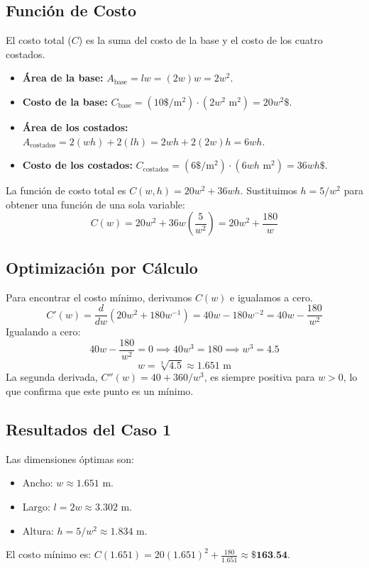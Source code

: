 \documentclass[12pt, letterpaper]{article}
\begin{document}
\subsection*{Función de Costo}
El costo total ($C$) es la suma del costo de la base y el costo de los cuatro costados.
\begin{itemize}
    \item \textbf{Área de la base:} $A_{\text{base}} = lw = (2w)w = 2w^2$.
    \item \textbf{Costo de la base:} $C_{\text{base}} = (10 \$/\text{m}^2) \cdot (2w^2 \text{ m}^2) = 20w^2 \$$.
    \item \textbf{Área de los costados:} $A_{\text{costados}} = 2(wh) + 2(lh) = 2wh + 2(2w)h = 6wh$.
    \item \textbf{Costo de los costados:} $C_{\text{costados}} = (6 \$/\text{m}^2) \cdot (6wh \text{ m}^2) = 36wh \$$.
\end{itemize}
La función de costo total es $C(w,h) = 20w^2 + 36wh$. Sustituimos $h = 5/w^2$ para obtener una función de una sola variable:
$$ C(w) = 20w^2 + 36w\left(\frac{5}{w^2}\right) = 20w^2 + \frac{180}{w} $$

\subsection*{Optimización por Cálculo}
Para encontrar el costo mínimo, derivamos $C(w)$ e igualamos a cero.
$$ C'(w) = \frac{d}{dw}\left(20w^2 + 180w^{-1}\right) = 40w - 180w^{-2} = 40w - \frac{180}{w^2} $$
Igualando a cero:
$$ 40w - \frac{180}{w^2} = 0 \implies 40w^3 = 180 \implies w^3 = 4.5 $$
$$ w = \sqrt[3]{4.5} \approx 1.651 \text{ m} $$
La segunda derivada, $C''(w) = 40 + 360/w^3$, es siempre positiva para $w>0$, lo que confirma que este punto es un mínimo.

\subsection*{Resultados del Caso 1}
Las dimensiones óptimas son:
\begin{itemize}
    \item Ancho: $w \approx 1.651$ m.
    \item Largo: $l = 2w \approx 3.302$ m.
    \item Altura: $h = 5/w^2 \approx 1.834$ m.
\end{itemize}
El costo mínimo es: $C(1.651) = 20(1.651)^2 + \frac{180}{1.651} \approx \textbf{\$163.54}$.

\newpage
\end{document}
